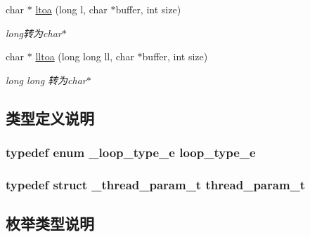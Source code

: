 \begin{DoxyCompactItemize}
char $\ast$ \hyperlink{a00084_aaf5ac9c0270bd67e64f697d7fcf5e9ea_aaf5ac9c0270bd67e64f697d7fcf5e9ea}{ltoa} (long l, char $\ast$buffer, int size)
\begin{DoxyCompactList}\small\item\em long转为char$\ast$ \end{DoxyCompactList}\item 
char $\ast$ \hyperlink{a00084_a97f61794357611fc4017112c868420b9_a97f61794357611fc4017112c868420b9}{lltoa} (long long ll, char $\ast$buffer, int size)
\begin{DoxyCompactList}\small\item\em long long 转为char$\ast$ \end{DoxyCompactList}\end{DoxyCompactItemize}


\subsection{类型定义说明}
\hypertarget{a00084_a93730d5de4a5f4dbe3013b02b051df62_a93730d5de4a5f4dbe3013b02b051df62}{}
\subsubsection[{loop\+\_\+type\+\_\+e}]{\setlength{\rightskip}{0pt plus 5cm}typedef enum {\bf \+\_\+loop\+\_\+type\+\_\+e}  {\bf loop\+\_\+type\+\_\+e}}\label{a00084_a93730d5de4a5f4dbe3013b02b051df62_a93730d5de4a5f4dbe3013b02b051df62}
\hypertarget{a00084_aaca514c4c0b391f40ccc7e8c68fd4c21_aaca514c4c0b391f40ccc7e8c68fd4c21}{}
\subsubsection[{thread\+\_\+param\+\_\+t}]{\setlength{\rightskip}{0pt plus 5cm}typedef struct {\bf \+\_\+thread\+\_\+param\+\_\+t}  {\bf thread\+\_\+param\+\_\+t}}\label{a00084_aaca514c4c0b391f40ccc7e8c68fd4c21_aaca514c4c0b391f40ccc7e8c68fd4c21}


\subsection{枚举类型说明}
\hypertarget{a00084_a2583618f1d6afdd0085a96f59b45d9bd_a2583618f1d6afdd0085a96f59b45d9bd}{}
